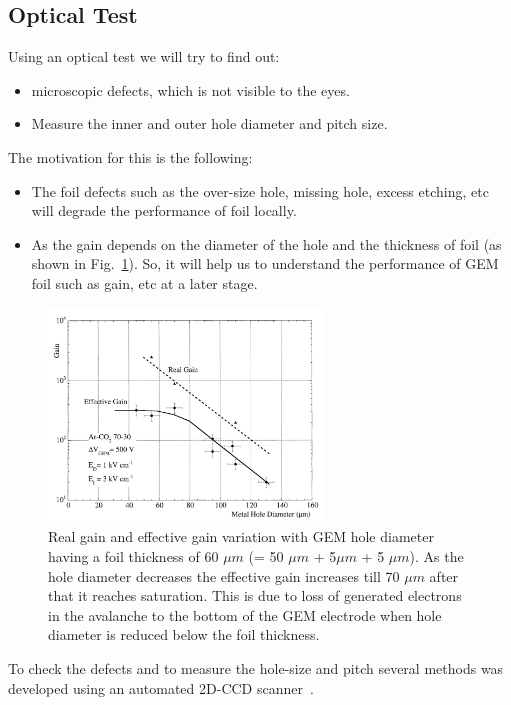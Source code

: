 \subsection{Optical Test} %
\label{sub:optical_test}
Using an optical test we will try to find out:
\begin{itemize}
    \item microscopic defects, which is not visible to the eyes.
    \item Measure the inner and outer hole diameter and pitch size.
\end{itemize}
The motivation for this is the following:
\begin{itemize}
    \item The foil defects such as the over-size hole, missing hole, excess etching, etc will degrade the performance of foil locally.
    \item As the gain depends on the diameter of the hole and the thickness of foil (as shown in Fig.~\ref{fig:gain-vs-holediameter}). So, it will help us to understand the performance of GEM foil such as gain, etc at a later stage.
\end{itemize}
\begin{figure}[htbp]
    \centering
    \includegraphics[width=0.65\textwidth]{figures/GEM/Gain_Vs_Hole_Diameter.png}
    \caption{Real gain and effective gain variation with GEM hole diameter~\cite{Bachmann1999} having a foil thickness of 60 $\mu m$ (= 50 $\mu m$ + 5$ \mu m$ + 5 $\mu m$). As the hole diameter decreases the effective gain increases till 70 $\mu m$ after that it reaches saturation. This is due to loss of generated electrons in the avalanche to the bottom of the GEM electrode when hole diameter is reduced below the foil thickness.}
    \label{fig:gain-vs-holediameter}
\end{figure}
To check the defects and to measure the hole-size and pitch several methods was developed using an automated 2D-CCD scanner~\cite{Posik2015, Becker2006}. 
